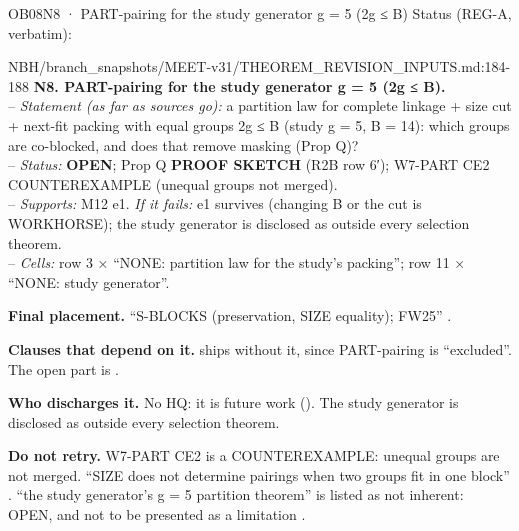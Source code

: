 \begin{card}{OB08}{N8 · PART-pairing for the study generator g = 5 (2g ≤ B)}
Status (REG-A, verbatim):  
\begin{stmt}{NBH/branch_snapshots/MEET-v31/THEOREM_REVISION_INPUTS.md:184-188}
\textbf{N8. PART-pairing for the study generator g = 5 (2g ≤ B).}\\
– \emph{Statement (as far as sources go):} a partition law for complete linkage + size cut + next-fit packing with equal groups 2g ≤ B (study g = 5, B = 14): which groups are co-blocked, and does that remove masking (Prop Q)?\\
– \emph{Status:} \textbf{OPEN}; Prop Q \textbf{PROOF SKETCH} (R2B row 6′); W7-PART CE2 COUNTEREXAMPLE (unequal groups not merged).\\
– \emph{Supports:} M12 e1. \emph{If it fails:} e1 survives (changing B or the cut is WORKHORSE); the study generator is disclosed as outside every selection theorem.\\
– \emph{Cells:} row 3 × ``NONE: partition law for the study's packing''; row 11 × ``NONE: study generator''.
\end{stmt}
\textbf{Final placement.} ``S-BLOCKS (preservation, SIZE equality); FW25'' .

\textbf{Clauses that depend on it.}  ships without it, since PART-pairing is ``excluded''. The open part is .

\textbf{Who discharges it.} No HQ: it is future work (). The study generator is disclosed as outside every selection theorem.

\textbf{Do not retry.} W7-PART CE2 is a COUNTEREXAMPLE: unequal groups are not merged. ``SIZE does not determine pairings when two groups fit in one block'' . ``the study generator's g = 5 partition theorem'' is listed as not inherent: OPEN, and not to be presented as a limitation .
\end{card}

